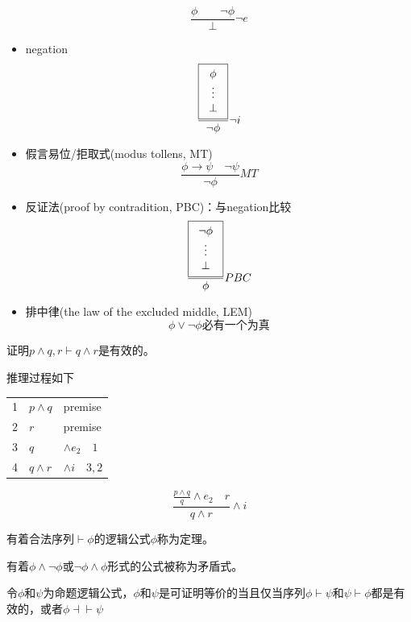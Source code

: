 \begin{itemize}
	\[\frac{\phi\qquad\lnot\phi}{\bot}\lnot e\]
	\item negation
	\[\frac{\fbox{\begin{tabular}{c}$\phi$\\$\vdots$\\$\bot$\end{tabular}}}{\lnot \phi}\lnot i\]
	\item 假言易位/拒取式(modus tollens, MT)
	\[\frac{\phi\to\psi\quad \lnot\psi}{\lnot\phi} MT\]
	\item 反证法(proof by contradition, PBC)：与negation比较
	\[\frac{\fbox{\begin{tabular}{c}$\lnot\phi$\\$\vdots$\\$\bot$\end{tabular}}}{\phi} PBC\]
	\item 排中律(the law of the excluded middle, LEM)
	\[\phi\lor\lnot\phi\text{必有一个为真}\]
\end{itemize}

\begin{example}
证明$p\land q,r\vdash q\land r$是有效的。
\end{example}
\begin{analysis}
推理过程如下
\begin{center}
\begin{tabular}{lll}
1 & $p\land q$ & premise\\
2 & $r$ & premise\\
3 & $q$ & $\land e_2\quad 1$\\
4 & $q\land r$ & $\land i\quad 3,2$
\end{tabular}
\end{center}
\[\frac{\frac{p\land q}{q}\land e_2\quad r}{q\land r}\land i\]
\end{analysis}

\begin{definition}[定理(theorem)]
有着合法序列$\vdash\phi$的逻辑公式$\phi$称为定理。
\end{definition}
\begin{definition}
有着$\phi\land\lnot\phi$或$\lnot\phi\land\phi$形式的公式被称为矛盾式。
\end{definition}

\begin{definition}
令$\phi$和$\psi$为命题逻辑公式，$\phi$和$\psi$是可证明等价的当且仅当序列$\phi\vdash\psi$和$\psi\vdash\phi$都是有效的，或者$\phi\dashv\vdash\psi$
\end{definition}

